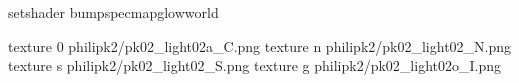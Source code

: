 setshader bumpspecmapglowworld


texture 0 philipk2/pk02_light02a_C.png
texture n philipk2/pk02_light02_N.png
texture s philipk2/pk02_light02_S.png
texture g philipk2/pk02_light02o_I.png

